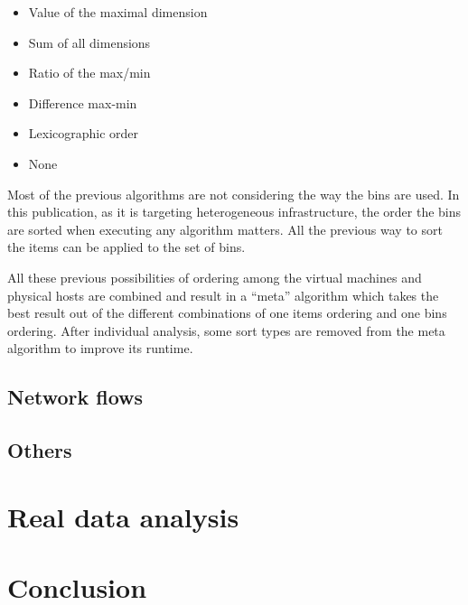 \documentclass[a4paper,11pt]{article}
\begin{document}
\begin{itemize}
	\item Value of the maximal dimension
	\item Sum of all dimensions
	\item Ratio of the max/min
	\item Difference max-min
	\item Lexicographic order
	\item None
\end{itemize}

Most of the previous algorithms are not considering the way the bins are used.
In this publication, as it is targeting heterogeneous infrastructure, the order
the bins are sorted when executing any algorithm matters. All the previous way to
sort the items can be applied to the set of bins.

All these previous possibilities of ordering among the virtual machines and physical
hosts are combined and result in a “meta” algorithm which takes the best result
out of the different combinations of one items ordering and one bins ordering. After
individual analysis, some sort types are removed from the meta algorithm to improve
its runtime.


\subsection{Network flows}

\subsection{Others}

\section{Real data analysis}

\section*{Conclusion}

\nocite{*}


\end{document}
